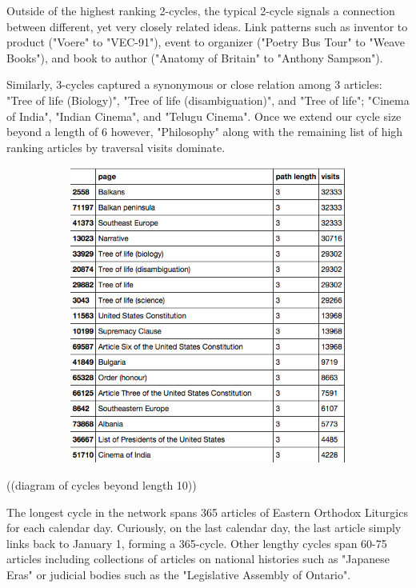 \documentclass[twoside]{article}
\begin{document}
Outside of the highest ranking 2-cycles, the typical 2-cycle signals a connection between different, yet very closely related ideas. 
Link patterns such as inventor to product ("Voere" to "VEC-91"), event to organizer ("Poetry Bus Tour" to "Weave Books"), and book to author ("Anatomy of Britain" to "Anthony Sampson").

Similarly, 3-cycles captured a synonymous or close relation among 3 articles: "Tree of life (Biology)", "Tree of life (disambiguation)", 
and "Tree of life"; "Cinema of India", "Indian Cinema", and "Telugu Cinema". Once we extend our cycle size beyond a length of 6 however, 
"Philosophy" along with the remaining list of high ranking articles by traversal visits dominate.

\begin{figure}[H]
\centering
\caption{highest ranking 3-Cycles}
    \begin{subfigure}[b]{0.8\textwidth}
        \includegraphics[width=\textwidth]{graphics/top_3loops.png}
    \end{subfigure}
\end{figure}
((diagram of cycles beyond length 10))

The longest cycle in the network spans 365 articles of Eastern Orthodox Liturgics for each calendar day. 
Curiously, on the last calendar day, the last article simply links back to January 1, forming a 365-cycle.
Other lengthy cycles span 60-75 articles including collections of articles on national histories such as "Japanese Eras" 
or judicial bodies such as the "Legislative Assembly of Ontario".
\end{document}
